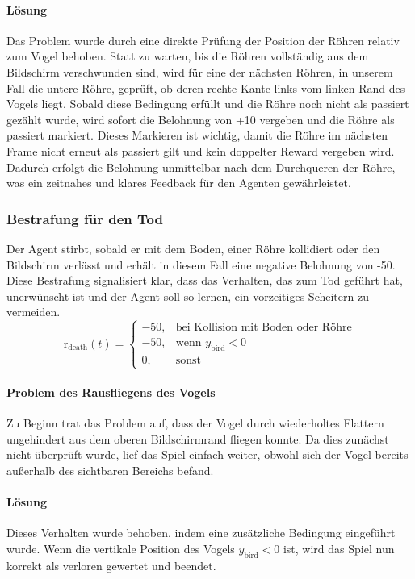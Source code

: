 \documentclass[conference]{IEEEtran}
\begin{document}
\paragraph{Lösung}
Das Problem wurde durch eine direkte Prüfung der Position der Röhren relativ zum Vogel behoben. Statt zu warten, bis die Röhren vollständig aus dem Bildschirm verschwunden sind, wird für eine der nächsten Röhren, in unserem Fall die untere Röhre, geprüft, ob deren rechte Kante links vom linken Rand des Vogels liegt. Sobald diese Bedingung erfüllt und die Röhre noch nicht als passiert gezählt wurde, wird sofort die Belohnung von +10 vergeben und die Röhre als passiert markiert. Dieses Markieren ist wichtig, damit die Röhre im nächsten Frame nicht erneut als passiert gilt und kein doppelter Reward vergeben wird. Dadurch erfolgt die Belohnung unmittelbar nach dem Durchqueren der Röhre, was ein zeitnahes und klares Feedback für den Agenten gewährleistet.\\

\subsubsection{Bestrafung für den Tod}\label{reward_design_third}
Der Agent stirbt, sobald er mit dem Boden, einer Röhre kollidiert oder den Bildschirm verlässt und erhält in diesem Fall eine negative Belohnung von -50. Diese Bestrafung signalisiert klar, dass das Verhalten, das zum Tod geführt hat, unerwünscht ist und der Agent soll so lernen, ein vorzeitiges Scheitern zu vermeiden.
\begin{equation}
	\text{r}_{\text{death}}(t) =
	\begin{cases}
		-50, & \text{bei Kollision mit Boden oder Röhre} \\
		-50, & \text{wenn } y_{\text{bird}} < 0 \\
		0,    & \text{sonst}
	\end{cases}
\end{equation}

\paragraph{Problem des Rausfliegens des Vogels}
Zu Beginn trat das Problem auf, dass der Vogel durch wiederholtes Flattern ungehindert aus dem oberen Bildschirmrand fliegen konnte. Da dies zunächst nicht überprüft wurde, lief das Spiel einfach weiter, obwohl sich der Vogel bereits außerhalb des sichtbaren Bereichs befand. 

\paragraph{Lösung}
Dieses Verhalten wurde behoben, indem eine zusätzliche Bedingung eingeführt wurde. Wenn die vertikale Position des Vogels \( y_{\text{bird}} < 0 \) ist, wird das Spiel nun korrekt als verloren gewertet und beendet.
\end{document}
